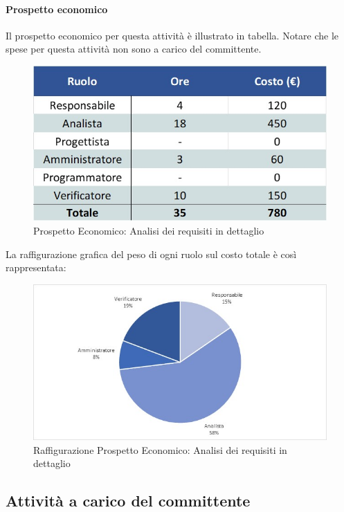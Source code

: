 \paragraph{Prospetto economico}
Il prospetto economico per questa attività è illustrato in tabella. Notare che le spese per questa attività non sono a carico del committente.
\begin{figure}[h!]
	\centerline{\includegraphics[scale=0.4]{img/Preventivo/AnalisiRequisitiDettaglioEconomico.jpg}}
	\caption{Prospetto Economico: Analisi dei requisiti in dettaglio}
\end{figure}
La raffigurazione grafica del peso di ogni ruolo sul costo totale è così rappresentata: 
\begin{figure}[h!]
	\centerline{\includegraphics[scale=0.4]{img/Preventivo/Torte/AnalisiRequisitiDettaglio.jpg}}
	\caption{Raffigurazione Prospetto Economico: Analisi dei requisiti in dettaglio}
\end{figure}

\subsection{Attività a carico del committente}
